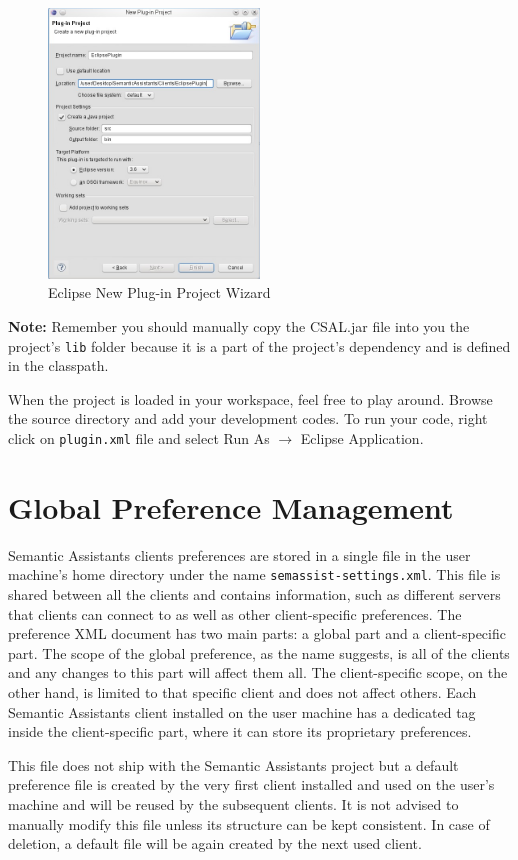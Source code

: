 \begin{figure}[htb]
\begin{center}
  \includegraphics[width=0.5\textwidth]{pictures/eclipse_project_wizard.jpg}
  \caption{Eclipse New Plug-in Project Wizard}
  \label{fig:eclipse_project_wizard}
\end{center}
\end{figure}

\textbf{Note:} Remember you should manually copy the CSAL.jar file into you the
project's \texttt{lib} folder because it is a part of the project's dependency
and is defined in the classpath.

When the project is loaded in your workspace, feel free to play around. Browse
the source directory and add your development codes. To run your code, right
click on \texttt{plugin.xml} file and select Run As $\rightarrow$ Eclipse
Application.

\section{Global Preference Management}
Semantic Assistants clients preferences are stored in a single file in the user machine's home directory under the name \texttt{semassist-settings.xml}. This file is shared between all the clients and contains information, such as different servers that clients can connect to as well as other client-specific preferences. The preference XML document has two main parts: a global part and a client-specific part. The scope of the global preference, as the name suggests, is all of the clients and any changes to this part will affect them all. The client-specific scope, on the other hand, is limited to that specific client and does not affect others. Each Semantic Assistants client installed on the user machine has a dedicated tag inside the client-specific part, where it can store its proprietary preferences.

This file does not ship with the Semantic Assistants project but a default preference file is created by the very first client installed and used on the user's machine and will be reused by the subsequent clients. It is not advised to manually modify this file unless its structure can be kept consistent. In case of deletion, a default file will be again created by the next used client.